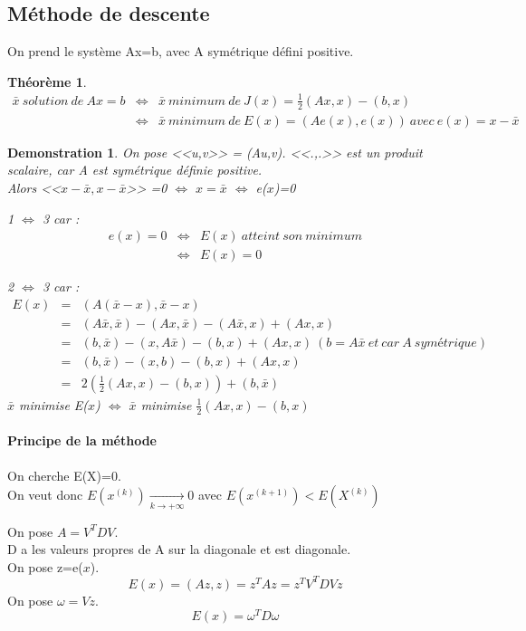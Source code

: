 \documentclass{article}
\theoremstyle{mes_theoremes}
\newtheorem*{dem}{Demonstration}
\newtheorem*{theo}{Théorème}
\begin{document}
\subsection{Méthode de descente}
On prend le système Ax=b, avec A symétrique défini positive.
\begin{theo}
\begin{eqnarray*}
\bar{x}\ solution\ de\ Ax=b &\Leftrightarrow& \bar{x}\ minimum\ de\ J(x)=\frac{1}{2}(Ax,x)-(b,x) \\
&\Leftrightarrow& \bar{x}\ minimum\ de\ E(x)=(Ae(x),e(x))\ avec\ e(x)=x-\bar{x}
\end{eqnarray*}
\end{theo}

\begin{dem}
On pose <<u,v>> = (Au,v). <<.,.>> est un produit scalaire, car A est symétrique définie positive. \\
Alors <<$x-\bar{x},x-\bar{x}$>> =0 $\Leftrightarrow$ $x=\bar{x}$ $\Leftrightarrow$ e($x$)=0

1 $\Leftrightarrow$ 3 car :
\begin{eqnarray*}
e(x)=0 &\Leftrightarrow& E(x)\ atteint\ son\ minimum \\
&\Leftrightarrow& E(x)=0
\end{eqnarray*}

2 $\Leftrightarrow$ 3 car :
\begin{eqnarray*}
E(x)&=&(A(\bar{x}-x),\bar{x}-x) \\
&=& (A\bar{x},\bar{x}) -(Ax,\bar{x}) - (A\bar{x},x) + (Ax,x) \\
&=& (b,\bar{x}) - (x,A\bar{x}) - (b,x) + (Ax,x)\ (b=A\bar{x}\ et\ car\ A\ symétrique) \\
&=& (b,\bar{x}) - (x,b) - (b,x) + (Ax,x) \\
&=& 2(\frac{1}{2} (Ax,x)-(b,x)) + (b,\bar{x})
\end{eqnarray*}
$\bar{x}$ minimise E($x$) $\Leftrightarrow$ $\bar{x}$ minimise $\frac{1}{2} (Ax,x)-(b,x)$
\end{dem}

\paragraph{Principe de la méthode \\}
On cherche E(X)=0.\\
On veut donc $E(x^{(k)}) \xrightarrow[k \to +\infty]{} 0$ avec $E(x^{(k+1)}) < E(X^{(k)})$ 

On pose $A=V^TDV$. \\
D a les valeurs propres de A sur la diagonale et est diagonale. \\
On pose z=e($x$). \[E(x)=(Az,z)=z^TAz=z^TV^TDVz\]
On pose $\omega=Vz$. \[E(x)=\omega^T D \omega\]
\end{document}
